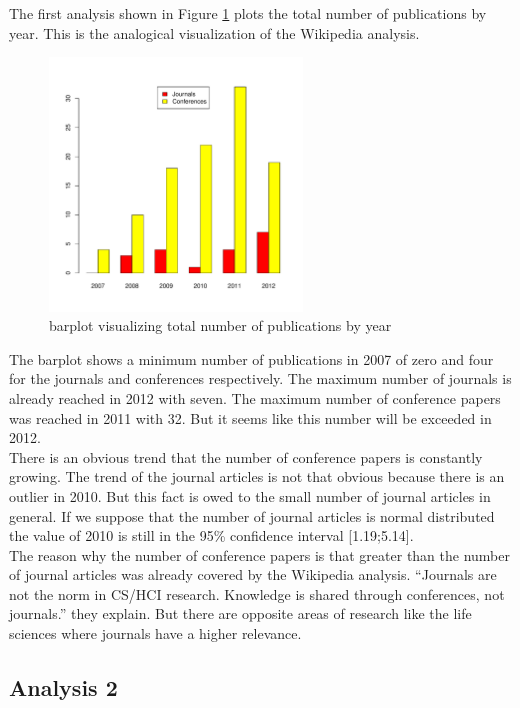 \documentclass[english]{lni}
\begin{document}
   The first analysis shown in Figure \ref{fig:auswertung1} plots the total
   number of publications by year. This is the analogical visualization of the
   Wikipedia analysis.



\begin{figure}[htb]
\centering
\includegraphics[width=0.6\textwidth]{auswertung1.pdf}
\caption{\label{fig:auswertung1}barplot visualizing total number of publications by year}
\end{figure}

   The barplot shows a minimum number of publications in 2007 of zero and four
   for the journals and conferences respectively. The maximum number of journals
   is already reached in 2012 with seven. The maximum number of conference
   papers was reached in 2011 with 32. But it seems like this number will be
   exceeded in 2012.\\ There is an obvious trend that the number of conference
   papers is constantly growing. The trend of the journal articles is not that
   obvious because there is an outlier in 2010. But this fact is owed to the
   small number of journal articles in general. If we suppose that the number of
   journal articles is normal distributed the value of 2010 is still in the 95\%
   confidence interval [1.19;5.14].\\ The reason why the number of conference
   papers is that greater than the number of journal articles was already
   covered by the Wikipedia analysis. ``Journals are not the norm in
   CS/HCI research. Knowledge is shared through conferences, not journals.''
   \cite{wiki} they explain. But there are opposite areas of research like the life sciences where
   journals have a higher relevance.
\subsection{Analysis 2}
\label{sec-3-2}
\end{document}
